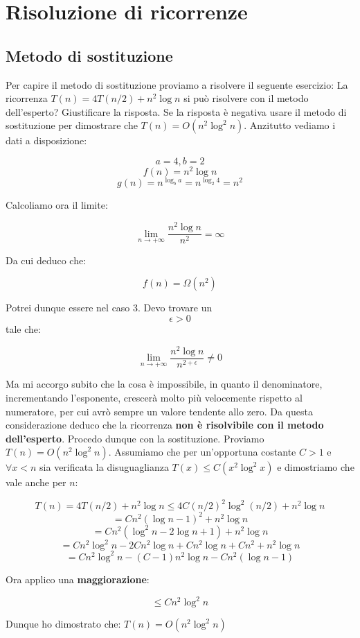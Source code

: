 \section{Risoluzione di ricorrenze}

\subsection{Metodo di sostituzione}

Per capire il metodo di sostituzione proviamo a risolvere il seguente esercizio:
\linebreak
\linebreak
La ricorrenza $T(n)=4T(n/2)+n^2\log n$ si può risolvere con il metodo dell'esperto? Giustificare la risposta. Se la risposta è negativa usare il metodo di sostituzione per dimostrare che $T(n)=O(n^2\log^2n)$.
\linebreak
\linebreak
Anzitutto vediamo i dati a disposizione:

$$a = 4, b = 2$$ 
$$f(n)=n^2\log n$$
$$g(n)=n^{\log_{b}a}=n^{\log_{2}4}=n^2$$

Calcoliamo ora il limite:

$$\lim_{n \to +\infty}\frac{n^2\log n}{n^2}=\infty$$

Da cui deduco che:

$$f(n)=\Omega(n^2)$$

Potrei dunque essere nel caso 3. Devo trovare un $$\epsilon > 0$$  tale che:

$$\lim_{n \to +\infty}\frac{n^2\log n}{n^{2+\epsilon}}\neq0$$

Ma mi accorgo subito che la cosa è impossibile, in quanto il denominatore, incrementando l'esponente, crescerà molto più velocemente rispetto al numeratore, per cui avrò sempre un valore tendente allo zero. Da questa considerazione deduco che la ricorrenza \textbf{non è risolvibile con il metodo dell'esperto}.
\linebreak
\linebreak
Procedo dunque con la sostituzione. Proviamo $T(n)=O(n^2\log^2n)$. Assumiamo che per un'opportuna costante $C>1$ e $\forall x<n$ sia verificata la disuguaglianza $T(x)\le C(x^2\log^2x)$ e dimostriamo che vale anche per $n$:

$$T(n)=4T(n/2)+n^2\log n \le 4C(n/2)^2\log^2(n/2)+n^2\log n$$
$$=Cn^2(\log n -1)^2+n^2\log n$$
$$=Cn^2(\log^2n-2\log n+1)+n^2\log n$$
$$=Cn^2\log^2n-2Cn^2\log n +Cn^2\log n+Cn^2+n^2\log n$$
$$=Cn^2\log^2n-(C-1)n^2\log n-Cn^2(\log n -1)$$

Ora applico una \textbf{maggiorazione}:

$$\le Cn^2\log^2n$$

Dunque ho dimostrato che: $T(n)=O(n^2\log^2n)$